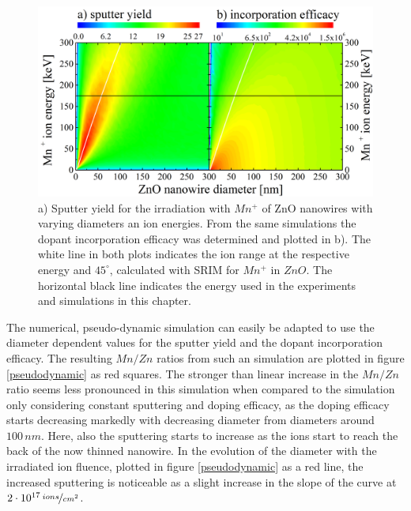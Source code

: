 \begin{figure}
	\centering
		\includegraphics[width=.85\textwidth]{images/sputterincorporate.png}
	\caption{a) Sputter yield for the irradiation with $Mn^+$ of ZnO nanowires with varying diameters an ion energies. From the same simulations the dopant incorporation efficacy was determined and plotted in b). The white line in both plots indicates the ion range at the respective energy and $45^\circ$, calculated with SRIM for $Mn^+$ in $ZnO$. The horizontal black line indicates the energy used in the experiments and simulations in this chapter.}
	\label{sputterincorporate}
\end{figure} 

The numerical, pseudo-dynamic simulation can easily be adapted to use the diameter dependent values for the sputter yield and the dopant incorporation efficacy. The resulting $Mn/Zn$ ratios from such an simulation are plotted in figure \ref{pseudodynamic} as red squares. The stronger than linear increase in the $Mn/Zn$ ratio seems less pronounced in this simulation when compared to the simulation only considering constant sputtering and doping efficacy, as the doping efficacy starts decreasing markedly with decreasing diameter from diameters around $100\,nm$. Here, also the sputtering starts to increase as the ions start to reach the back of the now thinned nanowire. In the evolution of the diameter with the irradiated ion fluence, plotted in figure \ref{pseudodynamic} as a red line, the increased sputtering is noticeable as a slight increase in the slope of the curve at $2\cdot 10^{17}\,\nicefrac{ions}{cm^2}$.


